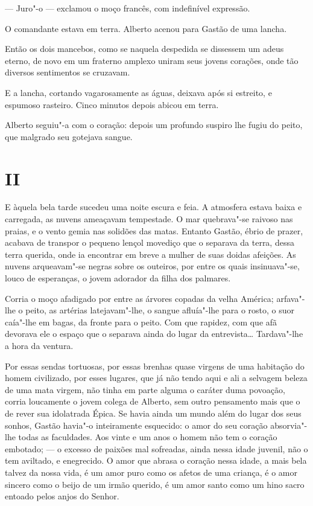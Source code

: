 --- Juro"-o --- exclamou o moço francês, com indefinível expressão.

O comandante estava em terra. Alberto acenou para Gastão de uma lancha.

Então os dois mancebos, como se naquela despedida se dissessem um adeus
eterno, de novo em um fraterno amplexo uniram seus jovens corações, onde
tão diversos sentimentos se cruzavam.

E a lancha, cortando vagarosamente as águas, deixava após si estreito, e
espumoso rasteiro. Cinco minutos depois abicou em terra.

Alberto seguiu"-a com o coração: depois um profundo suspiro lhe fugiu do
peito, que malgrado seu gotejava sangue.

\section*{II}

E àquela bela tarde sucedeu uma noite escura e feia. A atmosfera estava
baixa e carregada, as nuvens ameaçavam tempestade. O mar quebrava"-se
raivoso nas praias, e o vento gemia nas solidões das matas. Entanto
Gastão, ébrio de prazer, acabava de transpor o pequeno lençol movediço
que o separava da terra, dessa terra querida, onde ia encontrar em breve
a mulher de suas doidas afeições. As nuvens arqueavam"-se negras sobre os
outeiros, por entre os quais insinuava"-se, louco de esperanças, o jovem
adorador da filha dos palmares.

Corria o moço afadigado por entre as árvores copadas da velha América;
arfava"-lhe o peito, as artérias latejavam"-lhe, o sangue afluía"-lhe para
o rosto, o suor caía"-lhe em bagas, da fronte para o peito. Com que
rapidez, com que afã devorava ele o espaço que o separava ainda do lugar
da entrevista\ldots{} Tardava"-lhe a hora da ventura.

Por essas sendas tortuosas, por essas brenhas quase virgens de uma
habitação do homem civilizado, por esses lugares, que já não tendo aqui
e ali a selvagem beleza de uma mata virgem, não tinha em parte alguma o
caráter duma povoação, corria loucamente o jovem colega de Alberto, sem
outro pensamento mais que o de rever sua idolatrada Épica. Se havia
ainda um mundo além do lugar dos seus sonhos, Gastão havia"-o
inteiramente esquecido: o amor do seu coração absorvia"-lhe todas as
faculdades. Aos vinte e um anos o homem não tem o coração embotado; --- o
excesso de paixões mal sofreadas, ainda nessa idade juvenil, não o tem
aviltado, e enegrecido. O amor que abrasa o coração nessa idade, a mais
bela talvez da nossa vida, é um amor puro como os afetos de uma criança,
é o amor sincero como o beijo de um irmão querido, é um amor santo como
um hino sacro entoado pelos anjos do Senhor.


